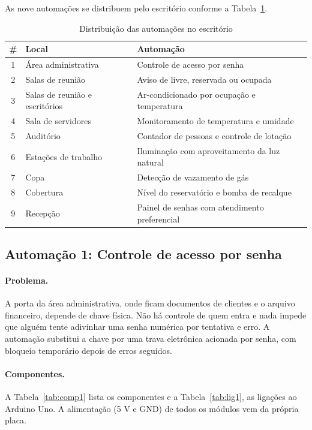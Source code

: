 \documentclass[12pt]{article}
\begin{document}
As nove automações se distribuem pelo escritório conforme a Tabela~\ref{tab:mapa}.

\begin{table}[!htb]
\centering
\caption{Distribuição das automações no escritório}\label{tab:mapa}
\small
\begin{tabularx}{\textwidth}{clX}
\toprule
\# & Local & Automação \\
\midrule
1 & Área administrativa & Controle de acesso por senha \\
2 & Salas de reunião & Aviso de livre, reservada ou ocupada \\
3 & Salas de reunião e escritórios & Ar-condicionado por ocupação e temperatura \\
4 & Sala de servidores & Monitoramento de temperatura e umidade \\
5 & Auditório & Contador de pessoas e controle de lotação \\
6 & Estações de trabalho & Iluminação com aproveitamento da luz natural \\
7 & Copa & Detecção de vazamento de gás \\
8 & Cobertura & Nível do reservatório e bomba de recalque \\
9 & Recepção & Painel de senhas com atendimento preferencial \\
\bottomrule
\end{tabularx}
\end{table}

\subsection{Automação 1: Controle de acesso por senha}\label{sub:a1}

\paragraph{Problema.} A porta da área administrativa, onde ficam documentos de clientes e o arquivo financeiro, depende de chave física. Não há controle de quem entra e nada impede que alguém tente adivinhar uma senha numérica por tentativa e erro. A automação substitui a chave por uma trava eletrônica acionada por senha, com bloqueio temporário depois de erros seguidos.

\paragraph{Componentes.} A Tabela~\ref{tab:comp1} lista os componentes e a Tabela~\ref{tab:lig1}, as ligações ao Arduino Uno. A alimentação (5 V e GND) de todos os módulos vem da própria placa.
\end{document}
